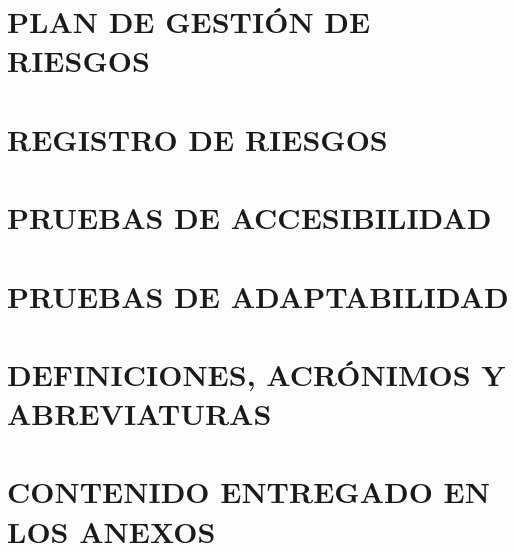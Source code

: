 \section*{PLAN DE GESTIÓN DE RIESGOS}
{}
\hypertarget{anexo:plan_de_gestion_de_riesgos}{}


\newpage
\section*{REGISTRO DE RIESGOS}
{}
\hypertarget{anexo:registro_de_riesgos}{}


\newpage
\section*{PRUEBAS DE ACCESIBILIDAD}


\newpage
\section*{PRUEBAS DE ADAPTABILIDAD}



\newpage
\section*{DEFINICIONES, ACRÓNIMOS Y ABREVIATURAS}
{}


\newpage
\section*{CONTENIDO ENTREGADO EN LOS ANEXOS} 


